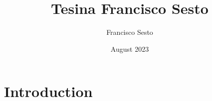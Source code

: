 \documentclass{article}
\title{Tesina Francisco Sesto}
\author{Francisco Sesto}
\date{August 2023}
\begin{document}
\maketitle

\section{Introduction}
\end{document}
